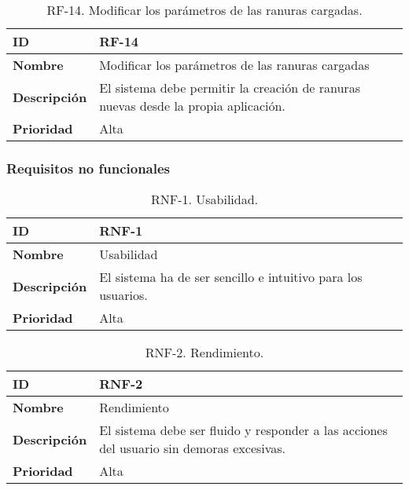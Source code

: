 \begin{table}[h!]
    \centering
    \begin{tabular}{|m{2.5cm}|m{9.27cm}|}
        \hline
        \textbf{ID} & RF-14 \\
        \hline
        \textbf{Nombre} & Modificar los parámetros de las ranuras cargadas \\
        \hline
        \textbf{Descripción} & El sistema debe permitir la creación de ranuras nuevas desde la propia aplicación. \\
        \hline
        \textbf{Prioridad} & Alta \\
        \hline
    \end{tabular}
    \caption{RF-14. Modificar los parámetros de las ranuras cargadas.}
\end{table}

\FloatBarrier

\subsubsection{Requisitos no funcionales}

\begin{table}[h!]
    \centering
    \begin{tabular}{|m{2.5cm}|m{9.27cm}|}
        \hline
        \textbf{ID} & RNF-1 \\
        \hline
        \textbf{Nombre} & Usabilidad \\
        \hline
        \textbf{Descripción} & El sistema ha de ser sencillo e intuitivo para los usuarios. \\
        \hline
        \textbf{Prioridad} & Alta \\
        \hline
    \end{tabular}
    \caption{RNF-1. Usabilidad.}
\end{table}

\begin{table}[h!]
    \centering
    \begin{tabular}{|m{2.5cm}|m{9.27cm}|}
        \hline
        \textbf{ID} & RNF-2 \\
        \hline
        \textbf{Nombre} & Rendimiento \\
        \hline
        \textbf{Descripción} & El sistema debe ser fluido y responder a las acciones del usuario sin demoras excesivas. \\
        \hline
        \textbf{Prioridad} & Alta \\
        \hline
    \end{tabular}
    \caption{RNF-2. Rendimiento.}
\end{table}

